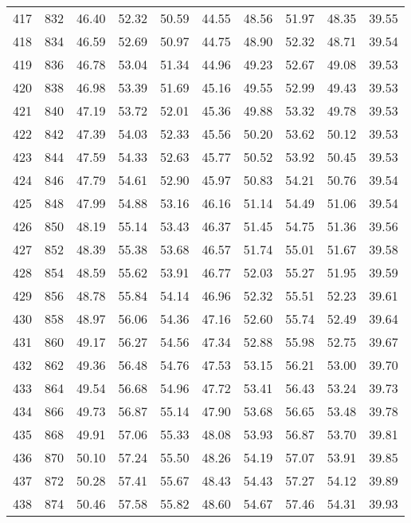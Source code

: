 \begin{longtable}{rrllllllll}
		417 & 832 & 46.40 & 52.32 & 50.59 & 44.55 & 48.56 & 51.97 & 48.35 & 39.55 \\ 
		418 & 834 & 46.59 & 52.69 & 50.97 & 44.75 & 48.90 & 52.32 & 48.71 & 39.54 \\ 
		419 & 836 & 46.78 & 53.04 & 51.34 & 44.96 & 49.23 & 52.67 & 49.08 & 39.53 \\ 
		420 & 838 & 46.98 & 53.39 & 51.69 & 45.16 & 49.55 & 52.99 & 49.43 & 39.53 \\ 
		421 & 840 & 47.19 & 53.72 & 52.01 & 45.36 & 49.88 & 53.32 & 49.78 & 39.53 \\ 
		422 & 842 & 47.39 & 54.03 & 52.33 & 45.56 & 50.20 & 53.62 & 50.12 & 39.53 \\ 
		423 & 844 & 47.59 & 54.33 & 52.63 & 45.77 & 50.52 & 53.92 & 50.45 & 39.53 \\ 
		424 & 846 & 47.79 & 54.61 & 52.90 & 45.97 & 50.83 & 54.21 & 50.76 & 39.54 \\ 
		425 & 848 & 47.99 & 54.88 & 53.16 & 46.16 & 51.14 & 54.49 & 51.06 & 39.54 \\ 
		426 & 850 & 48.19 & 55.14 & 53.43 & 46.37 & 51.45 & 54.75 & 51.36 & 39.56 \\ 
		427 & 852 & 48.39 & 55.38 & 53.68 & 46.57 & 51.74 & 55.01 & 51.67 & 39.58 \\ 
		428 & 854 & 48.59 & 55.62 & 53.91 & 46.77 & 52.03 & 55.27 & 51.95 & 39.59 \\ 
		429 & 856 & 48.78 & 55.84 & 54.14 & 46.96 & 52.32 & 55.51 & 52.23 & 39.61 \\ 
		430 & 858 & 48.97 & 56.06 & 54.36 & 47.16 & 52.60 & 55.74 & 52.49 & 39.64 \\ 
		431 & 860 & 49.17 & 56.27 & 54.56 & 47.34 & 52.88 & 55.98 & 52.75 & 39.67 \\ 
		432 & 862 & 49.36 & 56.48 & 54.76 & 47.53 & 53.15 & 56.21 & 53.00 & 39.70 \\ 
		433 & 864 & 49.54 & 56.68 & 54.96 & 47.72 & 53.41 & 56.43 & 53.24 & 39.73 \\ 
		434 & 866 & 49.73 & 56.87 & 55.14 & 47.90 & 53.68 & 56.65 & 53.48 & 39.78 \\ 
		435 & 868 & 49.91 & 57.06 & 55.33 & 48.08 & 53.93 & 56.87 & 53.70 & 39.81 \\ 
		436 & 870 & 50.10 & 57.24 & 55.50 & 48.26 & 54.19 & 57.07 & 53.91 & 39.85 \\ 
		437 & 872 & 50.28 & 57.41 & 55.67 & 48.43 & 54.43 & 57.27 & 54.12 & 39.89 \\ 
		438 & 874 & 50.46 & 57.58 & 55.82 & 48.60 & 54.67 & 57.46 & 54.31 & 39.93 \\ 

\end{longtable}
